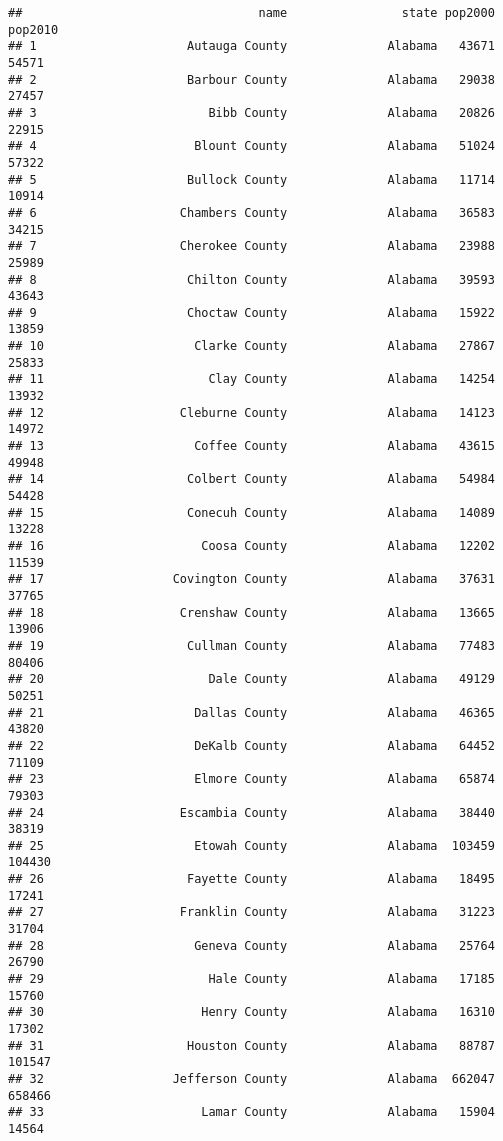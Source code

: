 \documentclass[
]{article}
\begin{document}
\begin{verbatim}
##                                 name                state pop2000 pop2010
## 1                     Autauga County              Alabama   43671   54571
## 2                     Barbour County              Alabama   29038   27457
## 3                        Bibb County              Alabama   20826   22915
## 4                      Blount County              Alabama   51024   57322
## 5                     Bullock County              Alabama   11714   10914
## 6                    Chambers County              Alabama   36583   34215
## 7                    Cherokee County              Alabama   23988   25989
## 8                     Chilton County              Alabama   39593   43643
## 9                     Choctaw County              Alabama   15922   13859
## 10                     Clarke County              Alabama   27867   25833
## 11                       Clay County              Alabama   14254   13932
## 12                   Cleburne County              Alabama   14123   14972
## 13                     Coffee County              Alabama   43615   49948
## 14                    Colbert County              Alabama   54984   54428
## 15                    Conecuh County              Alabama   14089   13228
## 16                      Coosa County              Alabama   12202   11539
## 17                  Covington County              Alabama   37631   37765
## 18                   Crenshaw County              Alabama   13665   13906
## 19                    Cullman County              Alabama   77483   80406
## 20                       Dale County              Alabama   49129   50251
## 21                     Dallas County              Alabama   46365   43820
## 22                     DeKalb County              Alabama   64452   71109
## 23                     Elmore County              Alabama   65874   79303
## 24                   Escambia County              Alabama   38440   38319
## 25                     Etowah County              Alabama  103459  104430
## 26                    Fayette County              Alabama   18495   17241
## 27                   Franklin County              Alabama   31223   31704
## 28                     Geneva County              Alabama   25764   26790
## 29                       Hale County              Alabama   17185   15760
## 30                      Henry County              Alabama   16310   17302
## 31                    Houston County              Alabama   88787  101547
## 32                  Jefferson County              Alabama  662047  658466
## 33                      Lamar County              Alabama   15904   14564

\end{verbatim}
\end{document}
